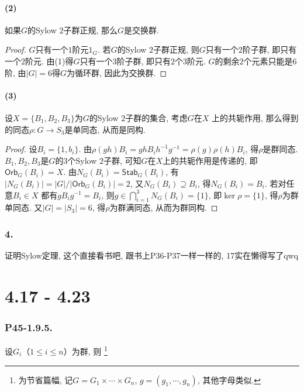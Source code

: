 \documentclass[12pt, a4paper, fontset=windows]{ctexart}
\newcommand{\Orb}{\mathsf{Orb}}
\newcommand{\Stab}{\mathsf{Stab}}
\newcommand{\abs}[1]{\left|{#1}\right|}
\newcommand{\kh}[1]{（{#1}）} %
\newcommand{\timess}{\times\cdots\times}
\begin{document}
\subsection*{(2)}

如果$G$的Sylow $2$子群正规, 那么$G$是交换群. 

\begin{proof}
$G$只有一个$1$阶元$1_G$. 
若$G$的Sylow $2$子群正规, 则$G$只有一个$2$阶子群, 
即只有一个$2$阶元. 由(1)得$G$只有一个$3$阶子群, 
即只有$2$个$3$阶元. $G$的剩余$2$个元素只能是$6$阶, 
由$\abs{G}=6$得$G$为循环群, 因此为交换群. 
\end{proof}

\subsection*{(3)}

设$X=\{B_1,B_2,B_3\}$为$G$的Sylow $2$子群的集合, 考虑$G$在$X$
上的共轭作用, 那么得到的同态$\rho:G\to S_3$是单同态, 从而是同构. 

\begin{proof}
设$B_i=\{1,b_i\}$. 
由$\rho(gh)B_i=ghB_ih^{-1}g^{-1}=\rho(g)\rho(h)B_i$, 得$\rho$是群同态. 
$B_1,B_2,B_3$是$G$的$3$个Sylow $2$子群, 可知$G$在$X$上的共轭作用是传递的, 即$\Orb_{G}(B_i)=X$. 
由$N_G(B_i)=\Stab_{G}(B_i)$, 有$\abs{N_G(B_i)}=\abs{G}/\abs{\Orb_{G}(B_i)}=2$, 
又$N_G(B_i)\supseteq B_i$, 得$N_G(B_i)=B_i$. 若对任意$B_i\in X$
都有$gB_ig^{-1}=B_i$, 则$g\in\bigcap^3_{i=1}N_G(B_i)=\{1\}$, 
即$\ker\rho=\{1\}$, 得$\rho$为群单同态. 又$\abs{G}=\abs{S_3}=6$, 
得$\rho$为群满同态, 从而为群同构. 
\end{proof}

\section*{4.}

证明Sylow定理, 这个直接看书吧, 跟书上P36-P37\cite{jsds}一样一样的, 17实在懒得写了{\sf qwq}

\clearpage
\part{4.17 - 4.23}

\section*{P45-1.9.5.}

设$G_i$\kh{$1\le i\le n$}为群, 则
\footnote{为节省篇幅, 记$G=G_1\timess G_n$, $g=(g_1,\cdots,g_n)$, 其他字母类似. }
\end{document}
